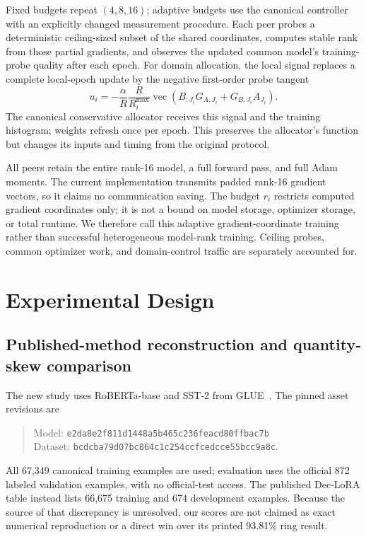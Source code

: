 \documentclass[11pt]{article}
\begin{document}
Fixed budgets repeat $(4,8,16)$; adaptive budgets use the canonical controller with an explicitly changed measurement procedure. Each peer probes a deterministic ceiling-sized subset of the shared coordinates, computes stable rank from those partial gradients, and observes the updated common model's training-probe quality after each epoch. For domain allocation, the local signal replaces a complete local-epoch update by the negative first-order probe tangent
\begin{equation}
 u_i=-\frac{\alpha}{R}\frac{R}{R_i^{\max}}
 \operatorname{vec}\!\left(B_{:J_i}G_{A,J_i}+
 G_{B,J_i}A_{J_i}\right).
 \label{eq:masked-domain-signal}
\end{equation}
The canonical conservative allocator receives this signal and the training histogram; weights refresh once per epoch. This preserves the allocator's function but changes its inputs and timing from the original protocol.

All peers retain the entire rank-16 model, a full forward pass, and full Adam moments. The current implementation transmits padded rank-16 gradient vectors, so it claims no communication saving. The budget $r_i$ restricts computed gradient coordinates only; it is not a bound on model storage, optimizer storage, or total runtime. We therefore call this adaptive gradient-coordinate training rather than successful heterogeneous model-rank training. Ceiling probes, common optimizer work, and domain-control traffic are separately accounted for.

\section{Experimental Design}
\subsection{Published-method reconstruction and quantity-skew comparison}
\label{sec:quantity-design}
The new study uses RoBERTa-base and SST-2 from GLUE~\citep{liu2019roberta,wang2019glue}. The pinned asset revisions are
\begin{quote}\small
Model: \texttt{e2da8e2f811d1448a5b465c236feacd80ffbac7b}\\
Dataset: \texttt{bcdcba79d07bc864c1c254ccfcedcce55bcc9a8c}.
\end{quote}
All 67,349 canonical training examples are used; evaluation uses the official 872 labeled validation examples, with no official-test access. The published Dec-LoRA table instead lists 66,675 training and 674 development examples. Because the source of that discrepancy is unresolved, our scores are not claimed as exact numerical reproduction or a direct win over its printed 93.81\% ring result.
\end{document}
